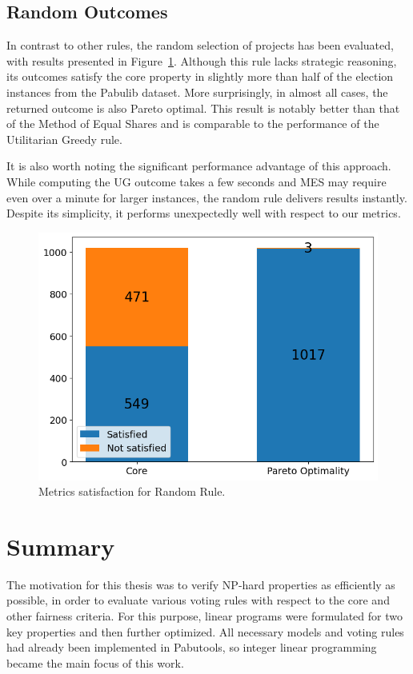\documentclass[magisterska,en]{pracamgr}
\begin{document}
\section{Random Outcomes}

In contrast to other rules, the random selection of projects has been evaluated, with results presented in Figure~\ref{random-metrics}. Although this rule lacks strategic reasoning, its outcomes satisfy the core property in slightly more than half of the election instances from the Pabulib dataset. More surprisingly, in almost all cases, the returned outcome is also Pareto optimal. This result is notably better than that of the Method of Equal Shares and is comparable to the performance of the Utilitarian Greedy rule.

It is also worth noting the significant performance advantage of this approach. While computing the UG outcome takes a few seconds and MES may require even over a minute for larger instances, the random rule delivers results instantly. Despite its simplicity, it performs unexpectedly well with respect to our metrics.

\begin{figure}[h!]
    \centering
    \includegraphics[width=0.46\linewidth]{outputs/MetricSatisfaction/random.png}
    \caption{Metrics satisfaction for Random Rule.}
    \label{random-metrics}
\end{figure}

\chapter{Summary}
\label{summary}

The motivation for this thesis was to verify NP-hard properties as efficiently as possible, in order to evaluate various voting rules with respect to the core and other fairness criteria. For this purpose, linear programs were formulated for two key properties and then further optimized. All necessary models and voting rules had already been implemented in Pabutools, so integer linear programming became the main focus of this work.
\end{document}
